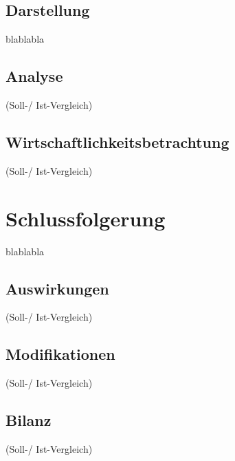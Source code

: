 \subsection{Darstellung}
\label{subsec:description:darstellung}
blablabla

\subsection{Analyse}
\label{subsec:description:analyse}
(Soll-/ Ist-Vergleich)

\subsection{Wirtschaftlichkeitsbetrachtung}
\label{subsec:description:ergebnisse:wirtschaftlichkeitsbetrachtung}
(Soll-/ Ist-Vergleich)

\section{Schlussfolgerung}
\label{sec:description:schlussfolgerung}
blablabla

\subsection{Auswirkungen}
\label{subsec:description:auswirkungen}
(Soll-/ Ist-Vergleich)

\subsection{Modifikationen}
\label{subsec:description:modifikationen}
(Soll-/ Ist-Vergleich)

\subsection{Bilanz}
\label{subsec:description:bilanz}
(Soll-/ Ist-Vergleich)
